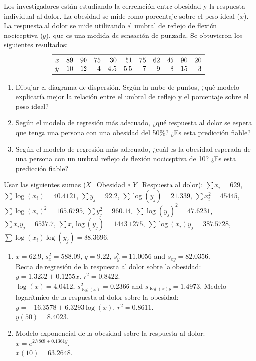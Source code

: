 {Los investigadores están estudiando la correlación entre obesidad y la respuesta individual al dolor. 
La obesidad se mide como porcentaje sobre el peso ideal ($x$).
La respuesta al dolor se mide utilizando el umbral de reflejo de flexión nociceptiva ($y$), que es una medida de sensación de punzada. Se obtuvieron los siguientes resultados:
\[
\begin{array}{lrrrrrrrrrr}
\toprule
x & 89 & 90 & 75 & 30 & 51 & 75 & 62 & 45 & 90 & 20\\
y & 10 & 12 & 4 & 4.5 & 5.5 & 7 & 9 & 8 & 15 & 3\\
\bottomrule
\end{array}
\]
\begin{enumerate}
\item Dibujar el diagrama de dispersión. Según la nube de puntos, ¿qué modelo explicaría mejor la relación entre el umbral de reflejo y el porcentaje sobre el peso ideal?
\item Según el modelo de regresión más adecuado, ¿qué respuesta al dolor se espera que tenga una persona con una obesidad del 50\%? ¿Es esta predicción fiable?
\item Según el modelo de regresión más adecuado, ¿cuál es la obesidad esperada de una persona con un umbral reflejo de flexión nociceptiva de 10? ¿Es esta predicción fiable?
\end{enumerate}

Usar las siguientes sumas ($X$=Obesidad e $Y$=Respuesta al dolor): $\sum x_i=629$, $\sum \log(x_i)=40.4121$, $\sum y_j=92.2$,
$\sum \log(y_j)=21.339$, $\sum x_i^2=45445$, $\sum \log(x_i)^2=165.6795$, $\sum y_j^2=960.14$, $\sum
\log(y_j)^2=47.6231$, $\sum x_iy_j=6537.7$, $\sum x_i\log(y_j)=1443.1275$, $\sum \log(x_i)y_j=387.5728$, $\sum \log(x_i)\log(y_j)=88.3696$.
}
{
\begin{enumerate}[start=2]
\item $\bar{x}=62.9$, $s_x^2=588.09$, $\bar{y}=9.22$, $s_y^2=11.0056$ and $s_{xy}=82.0356$.\\
Recta de regresión de la respuesta al dolor sobre la obesidad: $y=1.3232+0.1255x$. $r^2=0.8422$.\\
$\overline{\log(x)}=4.0412$, $s_{\log(x)}^2=0.2366$ and $s_{\log(x)y}=1.4973$.
Modelo logarítmico de la respuesta al dolor sobre la obesidad: $y=-16.3578+6.3293\log(x)$.
$r^2=0.8611$.\\
$y(50)=8.4023$.
\item Modelo exponencial de la obesidad sobre la respuesta al dolor: $x=e^{2.7868+0.1361y}$.\\
$x(10)=63.2648$.
\end{enumerate}
}
{
}


